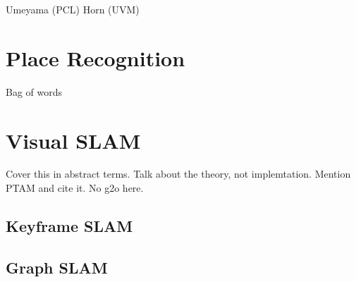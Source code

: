 Umeyama (PCL) \newline 
Horn (UVM)


\section{Place Recognition}

Bag of words

\section{Visual SLAM}

Cover this in abstract terms.  Talk about the theory, not implemtation.  Mention
PTAM and cite it.
No g2o here.

\subsection{Keyframe SLAM}

\subsection{Graph SLAM}
